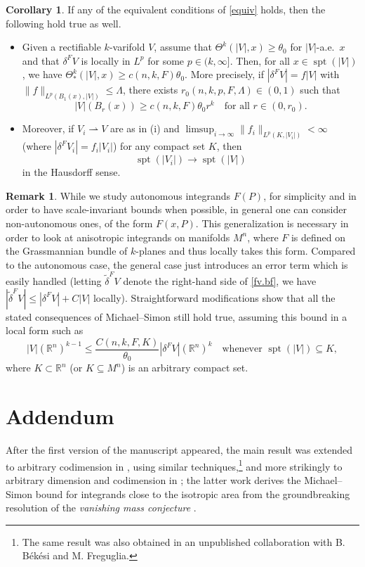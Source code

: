 \documentclass[11pt,a4paper]{amsart}
\newcommand{\R}{\mathbb{R}}
\theoremstyle{definition}
\newtheorem{rmk}[definition]{Remark}
\newtheorem{corollary}[definition]{Corollary}
\newcommand{\weakto}{\rightharpoonup}
\begin{document}
\begin{corollary}\label{usc}
    If any of the equivalent conditions of \cref{equiv} holds, then the following hold true as well.
    \begin{itemize}
        \item[(i)]
    Given a rectifiable $k$-varifold $V$, assume that $\Theta^k(|V|,x)\ge\theta_0$ for $|V|$-a.e.\ $x$ and that $\delta^FV$ is locally in $L^p$ for some $p\in (k,\infty]$.
    Then, for all $x\in\operatorname{spt}(|V|)$, we have $\Theta^k_*(|V|,x)\ge c(n,k,F)\theta_0$.
    More precisely, if $|\delta^FV|=f|V|$ with $\|f\|_{L^p(B_1(x),|V|)}\le\Lambda$,
    there exists $r_0(n,k,p,F,\Lambda)\in(0,1)$ such that
    \begin{equation}\label{lp.lb}|V|(B_r(x))\ge c(n,k,F)\theta_0r^k\quad\text{for all }r\in(0,r_0).\end{equation}
    \item[(ii)]
    Moreover, if $V_i\weakto V$ are as in (i) and $\limsup_{i\to\infty}\|f_i\|_{L^p(K,|V_i|)}<\infty$ (where $|\delta^FV_i|=f_i|V_i|$) for any compact set $K$, then
    $$\operatorname{spt}(|V_i|)\to\operatorname{spt}(|V|)$$
    in the Hausdorff sense.
    \end{itemize}
\end{corollary}



\begin{rmk}
    While we study autonomous integrands $F(P)$, for simplicity and in order to have scale-invariant bounds when possible, in general one can consider
    non-autonomous ones, of the form $F(x,P)$. This generalization is necessary
    in order to look at anisotropic integrands on manifolds $M^n$, where $F$ is
    defined on the Grassmannian bundle of $k$-planes and thus locally takes this form.
    Compared to the autonomous case, the general case just introduces an error term
    which is easily handled (letting ${\tilde\delta}^FV$ denote the right-hand side of \cref{fv.bf}, we have $|{\tilde\delta}^FV|\le|\delta^FV|+C|V|$ locally). Straightforward modifications show that all the stated consequences of
    Michael--Simon still hold true, assuming this bound in a local form such as
    $$|V|(\R^n)^{k-1}\le \frac{C(n,k,F,K)}{\theta_0}|\delta^FV|(\R^n)^k\quad\text{whenever }\operatorname{spt}(|V|)\subseteq K,$$
    where $K\subset\R^n$ (or $K\subseteq M^n$) is an arbitrary compact set.
\end{rmk}

\section*{Addendum}
After the first version of the manuscript appeared,
the main result was extended to arbitrary codimension in \cite{FT1}, using similar techniques,\footnote{The same result was also obtained in an unpublished collaboration with B. Békési and M. Freguglia.} and more strikingly to arbitrary dimension and codimension in \cite{FT2};
the latter work derives the Michael--Simon bound
for integrands close to the isotropic area from the groundbreaking resolution of the \emph{vanishing mass conjecture} \cite{GR}.
\end{document}
